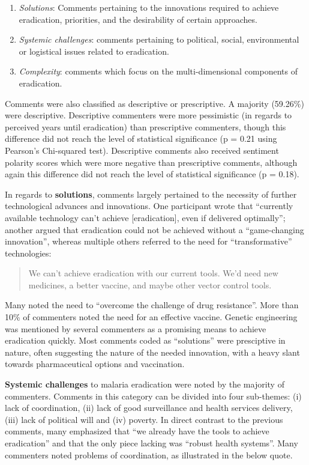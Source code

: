 \documentclass[]{article}
\begin{document}
\begin{enumerate}
\def\labelenumi{\arabic{enumi}.}
\item
  \emph{Solutions}: Comments pertaining to the innovations required to
  achieve eradication, priorities, and the desirability of certain
  approaches.
\item
  \emph{Systemic challenges}: comments pertaining to political, social,
  environmental or logistical issues related to eradication.
\item
  \emph{Complexity}: comments which focus on the multi-dimensional
  components of eradication.
\end{enumerate}

Comments were also classified as descriptive or prescriptive. A majority
(59.26\%) were descriptive. Descriptive commenters were more pessimistic
(in regards to perceived years until eradication) than prescriptive
commenters, though this difference did not reach the level of
statistical significance (p = 0.21 using Pearson's Chi-squared test).
Descriptive comments also received sentiment polarity scores which were
more negative than prescriptive comments, although again this difference
did not reach the level of statistical significance (p = 0.18).

In regards to \textbf{solutions}, comments largely pertained to the
necessity of further technological advances and innovations. One
participant wrote that ``currently available technology can't achieve
{[}eradication{]}, even if delivered optimally''; another argued that
eradication could not be achieved without a ``game-changing
innovation'', whereas multiple others referred to the need for
``transformative'' technologies:

\begin{quote}
We can't achieve eradication with our current tools. We'd need new medicines, a better vaccine, and maybe other vector control tools.
\end{quote}

Many noted the need to ``overcome the challenge of drug resistance''.
More than 10\% of commenters noted the need for an effective vaccine.
Genetic engineering was mentioned by several commenters as a promising
means to achieve eradication quickly. Most comments coded as
``solutions'' were presciptive in nature, often suggesting the nature of
the needed innovation, with a heavy slant towards pharmaceutical options
and vaccination.

\textbf{Systemic challenges} to malaria eradication were noted by the
majority of commenters. Comments in this category can be divided into
four sub-themes: (i) lack of coordination, (ii) lack of good
surveillance and health services delivery, (iii) lack of political will
and (iv) poverty. In direct contrast to the previous comments, many
emphasized that ``we already have the tools to achieve eradication'' and
that the only piece lacking was ``robust health systems''. Many
commenters noted problems of coordination, as illustrated in the below
quote.
\end{document}

